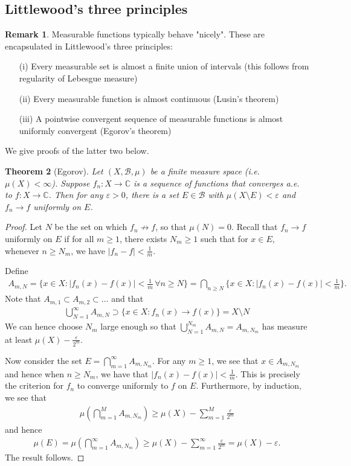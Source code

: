 \documentclass[11pt]{amsart}
\newtheorem{theorem}{Theorem}[section]
\theoremstyle{definition}
\newtheorem{remark}[theorem]{Remark}
\numberwithin{equation}{section}
\begin{document}
\subsection{Littlewood's three principles}
\begin{remark}
    Measurable functions typically behave "nicely". These are encapsulated in Littlewood's three principles:
    \begin{enumerate}
        \item [(i)] Every measurable set is almost a finite union of intervals (this follows from regularity of Lebesgue measure)
        \item [(ii)] Every measurable function is almost continuous (Lusin's theorem)
        \item [(iii)] A pointwise convergent sequence of measurable functions is almost uniformly convergent (Egorov's theorem)
    \end{enumerate}
    We give proofs of the latter two below.
\end{remark}
\begin{theorem}[Egorov]
    Let $(X,\mathcal B,\mu)$ be a finite measure space (i.e. $\mu(X)<\infty$). Suppose $f_n:X\to \mathbb C$ is a sequence of functions that converges a.e. to $f:X\to\mathbb C$. Then for any $\varepsilon>0$, there is a set $E\in\mathcal B$ with $\mu(X\setminus E)<\varepsilon$ and $f_n\to f$ uniformly on $E$.
\end{theorem}
\begin{proof}
    Let $N$ be the set on which $f_n\not\to f$, so that $\mu(N)=0$. Recall that $f_n\to f$ uniformly on $E$ if for all $m\ge 1$, there exists $N_m\ge 1$ such that for $x\in E$, whenever $n\ge N_m$, we have $|f_n-f|<\frac{1}{m}$.

    Define
    \begin{align*}
        A_{m,N}=\{x\in X:|f_n(x)-f(x)|<\frac{1}{m}\,\forall n\ge N\}=\bigcap_{n\ge N}\{x\in X:|f_n(x)-f(x)|<\frac{1}{m}\}.
    \end{align*}
    Note that $A_{m,1}\subset A_{m,2}\subset\ldots$ and that 
    \begin{align*}
        \bigcup_{N=1}^\infty A_{m,N}\supset \{x\in X:f_n(x)\to f(x)\}=X\setminus N
    \end{align*}
    We can hence choose $N_m$ large enough so that $\bigcup_{N=1}^{N_m}A_{m,N}=A_{m,N_m}$ has measure at least $\mu(X)-\frac{\varepsilon}{2^m}$.

    Now consider the set $E=\bigcap_{m=1}^\infty A_{m,N_m}$. For any $m\ge 1$, we see that $x\in A_{m,N_m}$ and hence when $n\ge N_m$, we have that $|f_n(x)-f(x)|<\frac{1}{m}$. This is precisely the criterion for $f_n$ to converge uniformly to $f$ on $E$. Furthermore, by induction, we see that
    \begin{align*}
        \mu(\bigcap_{m=1}^MA_{m,N_m})\ge \mu(X)-\sum_{m=1}^M\frac{\varepsilon}{2^m}
    \end{align*}
    and hence
    \begin{align*}
        \mu(E)=\mu(\bigcap_{m=1}^\infty A_{m,N_m})\ge\mu(X)-\sum_{m=1}^\infty\frac{\varepsilon}{2^m}=\mu(X)-\varepsilon.
    \end{align*}
    The result follows.
\end{proof}
\end{document}
